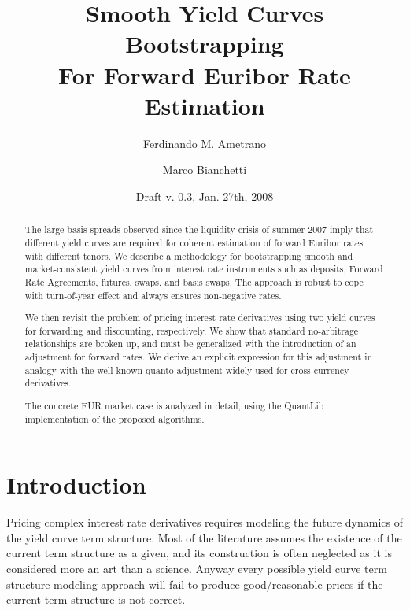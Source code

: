 \documentclass[11pt,reqno]{amsart}
\begin{document}
\title[Smooth Yield Curves For Euribor Estimation]{Smooth Yield Curves
Bootstrapping \\
For Forward Euribor Rate Estimation}
\author{Ferdinando M. Ametrano}
\address{Financial Engineering, Banca IMI, Piazzetta G. Dell'Amore 3, 20121
Milan Italy, ferdinando.ametrano@bancaimi.com}
\author{Marco Bianchetti}
\address{Risk Management, Banca Intesa S. Paolo, Piazza G. Ferrari 10, 20121
Milan Italy, marco.bianchetti@intesasanpaolo.com}
\date{Draft v. 0.3, Jan. 27th, 2008}

\begin{abstract}
The large basis spreads observed since the liquidity crisis of summer 2007
imply that
different yield curves are required for coherent estimation of forward Euribor
rates with different tenors. We describe a
methodology for bootstrapping smooth and market-consistent yield curves from
interest rate instruments such as deposits, Forward Rate Agreements,
futures, swaps, and basis
swaps. The approach is robust to cope with turn-of-year effect and always
ensures non-negative rates. 

We then revisit the problem of pricing interest
rate derivatives using two yield curves for forwarding and discounting,
respectively. We show that standard no-arbitrage relationships are broken
up, and must be generalized with the introduction of an adjustment for
forward rates. We derive an explicit expression for this adjustment in
analogy with the well-known quanto adjustment widely used for cross-currency
derivatives. 

The concrete EUR market case is analyzed in detail, using the QuantLib
implementation of the proposed algorithms.
\end{abstract}

\maketitle

\section{Introduction}

Pricing complex interest rate derivatives requires modeling the future
dynamics of the yield curve term structure. Most of the literature assumes
the existence of the current term structure as a given, and its construction
is often neglected as it is considered more an art than a science. Anyway
every possible yield curve term structure modeling approach will fail to
produce good/reasonable prices if the current term structure is not correct.
\end{document}
